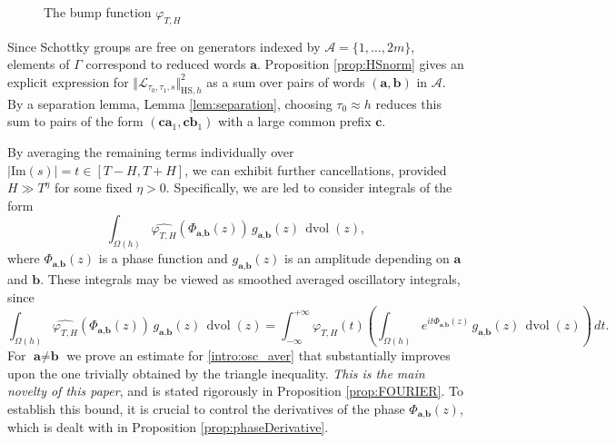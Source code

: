 \documentclass[12pt,letterpaper]{amsart}
\theoremstyle{plain}
\theoremstyle{definition}
\theoremstyle{remark}
\newcommand{\Aa}{\textbf{a}}
\newcommand{\Bb}{\textbf{b}}
\newcommand{\Cc}{\textbf{c}}
\DeclareMathOperator{\dvol}{dvol}
\begin{document}
\begin{figure}[htbp]
  \centering
  \caption{The bump function $\varphi_{T,H}$}
  \label{fig:bump-function}
\end{figure}

Since Schottky groups are free on generators indexed by $\mathcal{A} = \{1, \dots, 2m\}$, elements of $\Gamma$ correspond to reduced words $\Aa$. Proposition \ref{prop:HSnorm} gives an explicit expression for $\Vert \mathcal{L}_{\tau_0,\tau_1,s} \Vert_{\mathrm{HS}, h}^2$ as a sum over pairs of words $(\Aa, \Bb)$ in $\mathcal{A}$. By a separation lemma, Lemma \ref{lem:separation}, choosing $\tau_0 \approx h$ reduces this sum to pairs of the form $(\Cc \Aa_1, \Cc \Bb_1)$ with a large common prefix $\Cc$.

By averaging the remaining terms individually over $\vert \mathrm{Im}(s)\vert = t\in [T-H,T+H]$, we can exhibit further cancellations, provided $H\gg T^{\eta}$ for some fixed $\eta >0$. Specifically, we are led to consider integrals of the form
\begin{equation}\label{intro:osc_aver}
\int_{\Omega(h)} \widehat{\varphi_{T,H}}(\Phi_{\Aa,\Bb}(z)) \, g_{\Aa,\Bb}(z)\, \dvol(z),
\end{equation}
where $\Phi_{\Aa,\Bb}(z)$ is a phase function and $g_{\Aa,\Bb}(z)$ is an amplitude depending on $\Aa$ and $\Bb$. These integrals may be viewed as smoothed averaged oscillatory integrals, since
$$
\int_{\Omega(h)} \widehat{\varphi_{T,H}}(\Phi_{\Aa,\Bb}(z)) \, g_{\Aa,\Bb}(z)\, \dvol(z) = \int_{-\infty}^{+\infty} \varphi_{T,H}(t) \left( \int_{\Omega(h)} e^{it  \Phi_{\Aa,\Bb}(z) } \, g_{\Aa,\Bb}(z)\,\dvol(z)\right)\,  dt.
$$
For $\Aa\neq \Bb$ we prove an estimate for \eqref{intro:osc_aver} that substantially improves upon the one trivially obtained by the triangle inequality. \textit{This is the main novelty of this paper}, and is stated rigorously in Proposition \ref{prop:FOURIER}. To establish this bound, it is crucial to control the derivatives of the phase $\Phi_{\Aa,\Bb}(z)$, which is dealt with in Proposition \ref{prop:phaseDerivative}.
\end{document}
